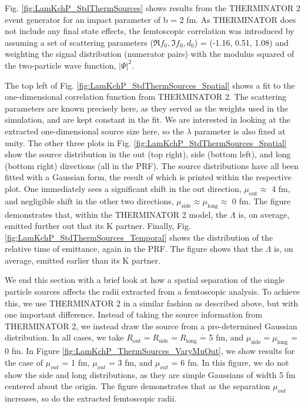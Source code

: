 \documentclass[ALICE,manyauthors]{cernphprep}
\newcommand{\Lam}{$\Lambda$\xspace}
\begin{document}
Fig. \ref{fig:LamKchP_StdThermSources} shows results from the THERMINATOR 2 event generator for an impact parameter of b = 2 fm.
As THERMINATOR does not include any final state effects, the femtoscopic correlation was introduced by assuming a set of scattering parameters ($\Re f_{0}, \Im f_{0}, d_{0}$) = (-1.16, 0.51, 1.08) and weighting the signal distribution (numerator pairs) with the modulus squared of the two-particle wave function, $|\Psi|^{2}$.

The top left of Fig. \ref{fig:LamKchP_StdThermSources_Spatial} shows a fit to the one-dimensional correlation function from THERMINATOR 2.
The scattering parameters are known precisely here, as they served as the weights used in the simulation, and are kept constant in the fit.
We are interested in looking at the extracted one-dimensional source size here, so the $\lambda$ parameter is also fixed at unity.
The other three plots in Fig. \ref{fig:LamKchP_StdThermSources_Spatial} show the source distribution in the out (top right), side (bottom left), and long (bottom right) directions (all in the PRF).
The source distributions have all been fitted with a Gaussian form, the result of which is printed within the respective plot.
One immediately sees a significant shift in the out direction, $\mu_{\mathrm{out}} \approx$ 4 fm, and negligible shift in the other two directions, $\mu_{\mathrm{side}} \approx \mu_{\mathrm{long}} \approx$ 0 fm.
The figure demonstrates that, within the THERMINATOR 2 model, the \Lam is, on average, emitted further out that its K partner.
Finally, Fig. \ref{fig:LamKchP_StdThermSources_Temporal} shows the distribution of the relative time of emittance, again in the PRF.
The figure shows that the \Lam is, on average, emitted earlier than its K partner. 

We end this section with a brief look at how a spatial separation of the single particle sources affects the radii extracted from a femtoscopic analysis.
To achieve this, we use THERMINATOR 2 in a similar fashion as described above, but with one important difference.
Instead of taking the source information from THERMINATOR 2, we instead draw the source from a pre-determined Gaussian distribution.
In all cases, we take $R_{\mathrm{out}} = R_{\mathrm{side}} = R_{\mathrm{long}}$ = 5 fm, and $\mu_{\mathrm{side}} = \mu_{\mathrm{long}}$ = 0 fm.
In Figure \ref{fig:LamKchP_ThermSources_VaryMuOut}, we show results for the case of $\mu_{out}$ = 1 fm, $\mu_{out}$ = 3 fm, and $\mu_{out}$ = 6 fm.
In this figure, we do not show the side and long distributions, as they are simple Gaussians of width 5 fm centered about the origin.
The figure demonstrates that as the separation $\mu_{out}$ increases, so do the extracted femtoscopic radii.
\end{document}
